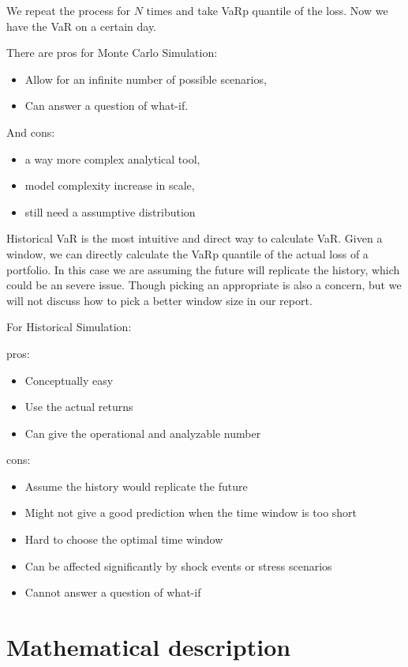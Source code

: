 \documentclass[letterpaper,11pt, oneside]{layout}
\begin{document}
We repeat the process for $N$ times and take VaRp quantile of the loss. Now we have the VaR on a certain day.

There are pros for Monte Carlo Simulation:

\begin{itemize}
\item Allow for an infinite number of possible scenarios,
\item Can answer a question of what-if.
\end{itemize}

And cons:
\begin{itemize}
\item a way more complex analytical tool,
\item model complexity increase in scale,
\item still need a assumptive distribution
\end{itemize}

Historical VaR is the most intuitive and direct way to calculate VaR. Given a window, we can directly calculate the VaRp quantile of the actual loss of a portfolio. In this case we are assuming the future will replicate the history, which could be an severe issue. Though picking an appropriate is also a concern, but we will not discuss how to pick a better window size in our report. 

For Historical Simulation:

pros:
\begin{itemize}
\item Conceptually easy
\item Use the actual returns 
\item Can give the operational and analyzable number
\end{itemize}
cons:
\begin{itemize}
\item Assume the history would replicate the future
\item Might not give a good prediction when the time window is too short
\item Hard to choose the optimal time window
\item Can be affected significantly by shock events or stress scenarios
\item Cannot answer a question of what-if
\end{itemize}


\section{Mathematical description}
\label{sec:md:md}
\end{document}
